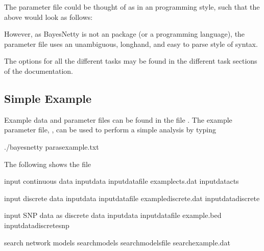 \documentclass[letterpaper,10pt,english]{sphinxmanual}
\begin{document}
\sphinxAtStartPar
The parameter file could be thought of as in an  programming style, such that the above would look as follows:

\begin{sphinxVerbatim}[commandchars=\\\{\}]


\end{sphinxVerbatim}

\sphinxAtStartPar
However, as BayesNetty is not an  package (or a programming language), the parameter file uses an unambiguous, longhand, and easy to parse style of syntax.

\sphinxAtStartPar
The options for all the different tasks may be found in the different task sections of the documentation.


\subsection{Simple Example}
\label{\detokenize{using:simple-example}}\label{\detokenize{using:id3}}
\sphinxAtStartPar
Example data and parameter files can be found in the file .
The example parameter file, , can be used to perform a simple analysis by typing

\begin{sphinxVerbatim}[commandchars=\\\{\}]
./bayesnetty paras\PYGZhy{}example.txt
\end{sphinxVerbatim}

\sphinxAtStartPar
The following shows the  file

\begin{sphinxVerbatim}[commandchars=\\\{\}]
\PYGZsh{}input continuous data
\PYGZhy{}input\PYGZhy{}data
\PYGZhy{}input\PYGZhy{}data\PYGZhy{}file example\PYGZhy{}cts.dat
\PYGZhy{}input\PYGZhy{}data\PYGZhy{}cts

\PYGZsh{}input discrete data
\PYGZhy{}input\PYGZhy{}data
\PYGZhy{}input\PYGZhy{}data\PYGZhy{}file example\PYGZhy{}discrete.dat
\PYGZhy{}input\PYGZhy{}data\PYGZhy{}discrete

\PYGZsh{}input SNP data as discrete data
\PYGZhy{}input\PYGZhy{}data
\PYGZhy{}input\PYGZhy{}data\PYGZhy{}file example.bed
\PYGZhy{}input\PYGZhy{}data\PYGZhy{}discrete\PYGZhy{}snp

\PYGZsh{}search network models
\PYGZhy{}search\PYGZhy{}models
\PYGZhy{}search\PYGZhy{}models\PYGZhy{}file search\PYGZhy{}example.dat
\end{sphinxVerbatim}
\end{document}
